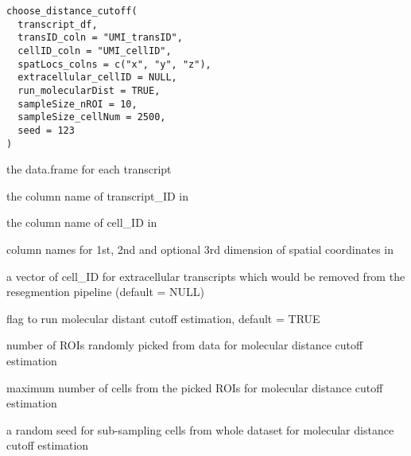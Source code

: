\documentclass[letterpaper]{book}
\begin{document}
%
\begin{Usage}
\begin{verbatim}
choose_distance_cutoff(
  transcript_df,
  transID_coln = "UMI_transID",
  cellID_coln = "UMI_cellID",
  spatLocs_colns = c("x", "y", "z"),
  extracellular_cellID = NULL,
  run_molecularDist = TRUE,
  sampleSize_nROI = 10,
  sampleSize_cellNum = 2500,
  seed = 123
)
\end{verbatim}
\end{Usage}
%
\begin{Arguments}
\begin{ldescription}
\item[\code{transcript\_df}] the data.frame for each transcript

\item[\code{transID\_coln}] the column name of transcript\_ID in 

\item[\code{cellID\_coln}] the column name of cell\_ID in 

\item[\code{spatLocs\_colns}] column names for 1st, 2nd and optional 3rd dimension of spatial coordinates in 

\item[\code{extracellular\_cellID}] a vector of cell\_ID for extracellular transcripts which would be removed from the resegmention pipeline (default = NULL)

\item[\code{run\_molecularDist}] flag to run molecular distant cutoff estimation, default = TRUE

\item[\code{sampleSize\_nROI}] number of ROIs randomly picked from data for molecular distance cutoff estimation

\item[\code{sampleSize\_cellNum}] maximum number of cells from the picked ROIs for molecular distance cutoff estimation

\item[\code{seed}] a random seed for sub-sampling cells from whole dataset for molecular distance cutoff estimation
\end{ldescription}
\end{Arguments}
%
\end{document}
